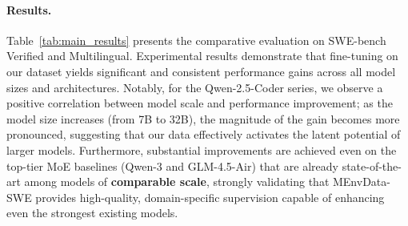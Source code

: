 \documentclass{article}
\theoremstyle{plain}
\theoremstyle{definition}
\theoremstyle{remark}
\begin{document}
\paragraph{Results.} 
Table~\ref{tab:main_results} presents the comparative evaluation on SWE-bench Verified and Multilingual. 
Experimental results demonstrate that fine-tuning on our dataset yields significant and consistent performance gains across all model sizes and architectures.
Notably, for the Qwen-2.5-Coder series, we observe a positive correlation between model scale and performance improvement; as the model size increases (from 7B to 32B), the magnitude of the gain becomes more pronounced, suggesting that our data effectively activates the latent potential of larger models.
Furthermore, substantial improvements are achieved even on the top-tier MoE baselines (Qwen-3 and GLM-4.5-Air) that are already state-of-the-art among models of \textbf{comparable scale}, strongly validating that MEnvData-SWE provides high-quality, domain-specific supervision capable of enhancing even the strongest existing models.




\end{document}
